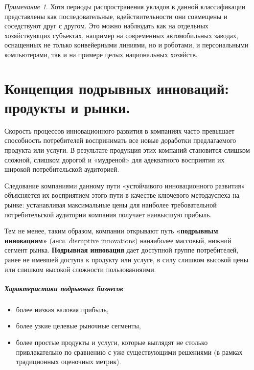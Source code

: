 \documentclass[11pt]{article}
\theoremstyle{plain} %
\theoremstyle{definition} %
\theoremstyle{remark} %
\newtheorem{nota}{Примечание}
\begin{document}
\begin{nota}
	Хотя  периоды  распространения  укладов  в  данной  классификации представлены  как  последовательные,  вдействительности  они  совмещены  и соседствуют  друг  с  другом.  Это  можно  наблюдать  как  на  отдельных хозяйствующих субъектах, например на современных автомобильных заводах, оснащенных   не   только   конвейерными   линиями,   но   и   роботами,   и персональными компьютерами, так и на примере целых национальных хозяйств.
\end{nota}

\newpage

\section{Концепция подрывных инноваций: продукты и рынки.}\label{erste}

Скорость процессов инновационного развития в  компаниях  часто  превышает  способность  потребителей  воспринимать  все
новые доработки предлагаемого продукта или услуги. В результате продукция этих компаний становится слишком сложной, слишком дорогой и «мудреной» для  адекватного  восприятия  их  широкой  потребительской  аудиторией.

\vspace{1em}
Следование компаниями данному пути «устойчивого инновационного развития» объясняется их восприятием этого пути в качестве ключевого методауспеха на рынке:  устанавливая  максимальные  цены  для  наиболее  требовательной потребительской аудитории компания получает наивысшую прибыль.

\vspace{1em}
Тем  не  менее,  таким  образом,  компании  открывают  путь  \textbf{«подрывным инновациям»}  (англ. disruptive innovations)  нанаиболее массовый,  нижний сегмент рынка.  \textbf{Подрывная инновация} дает доступной группе потребителей, ранее не имевшей доступа к продукту или услуге, в силу слишком высокой цены или слишком высокой сложности пользованияими.

\subparagraph{Характеристики подрывных бизнесов}

\begin{itemize}
		\item более низкая валовая прибыль,
		\item более узкие целевые рыночные сегменты,
		\item более  простые  продукты  и  услуги,  которые  выглядят  не  столько привлекательно  по  сравнению    с  уже  существующими  решениями  (в рамках традиционных оценочных метрик).
\end{itemize}
\end{document}
